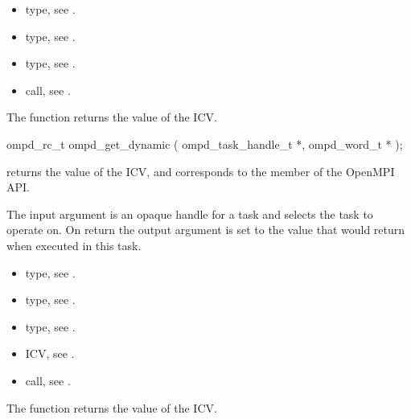 \crossreferences
\begin{itemize}
  \item {} type, see .
	\item {} type, see .
	\item {} type, see .
	\item {} call, see .
\end{itemize}


\label{subsubsubsec:ompd_get_dynamic}
\summary
The  function returns the value of the  ICV.

\format
\begin{cspecific}
\begin{ompSyntax}
ompd_rc_t ompd_get_dynamic (
  ompd_task_handle_t *,
  ompd_word_t *
);
\end{ompSyntax}
\end{cspecific}

\descr
{} returns the value of the
 ICV,
and corresponds to the  member of the OpenMPI API.

\argdesc
The input argument  is an opaque handle for a task and selects the task to operate on.
On return the output argument  is set to the value that  would return when
executed in this task.

\crossreferences
\begin{itemize}
  \item {} type, see .
	\item {} type, see .
	\item {} type, see .
	\item {} ICV, see .
	\item {} call, see .
\end{itemize}


\label{subsubsubsec:ompd_get_nested}
\summary
The  function returns the value of the  ICV.

